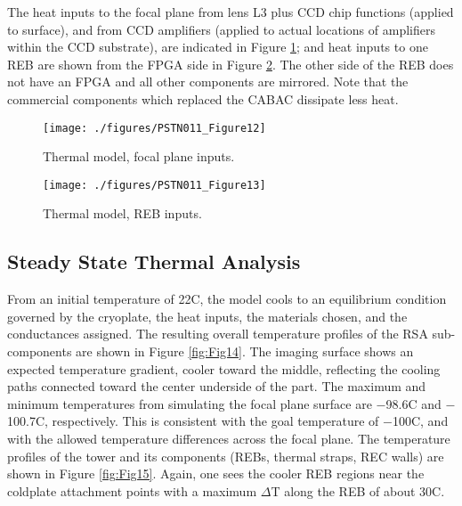 
The heat inputs to the focal plane from lens L3 plus CCD chip functions (applied to surface), and from CCD amplifiers (applied to actual locations of amplifiers within the CCD substrate), are indicated in Figure \ref{fig:Fig12}; and heat inputs to one REB are shown from the FPGA side in Figure \ref{fig:Fig13}. The other side of the REB does not have an FPGA and all other components are mirrored. Note that the commercial components which replaced the CABAC dissipate less heat. 

\begin{figure}[htbp]
\begin{center}
\texttt{[image: ./figures/PSTN011\_Figure12]}
\caption{Thermal model, focal plane inputs.}
\label{fig:Fig12}
\end{center}
\end{figure} 

\begin{figure}[htbp]
\begin{center}
\texttt{[image: ./figures/PSTN011\_Figure13]}
\caption{Thermal model, REB inputs.}
\label{fig:Fig13}
\end{center}
\end{figure} 

\subsection{Steady State Thermal Analysis}
From an initial temperature of 22\degsym C, the model cools to an equilibrium condition governed by the cryoplate, the heat inputs, the materials chosen, and the conductances assigned. The resulting overall temperature profiles of the RSA sub-components are shown in Figure \ref{fig:Fig14}. The imaging surface shows an expected temperature gradient, cooler toward the middle, reflecting the cooling paths connected toward the center underside of the part. The maximum and minimum temperatures from simulating the focal plane surface are $-$98.6\degsym C and $-$100.7\degsym C, respectively. This is consistent with the goal temperature of $-$100\degsym C, and with the allowed temperature differences across the focal plane. The temperature profiles of the tower and its components (REBs, thermal straps, REC walls) are shown in Figure \ref{fig:Fig15}. Again, one sees the cooler REB regions near the coldplate attachment points with a maximum $\Delta$T along the REB of about 30\degsym C.

